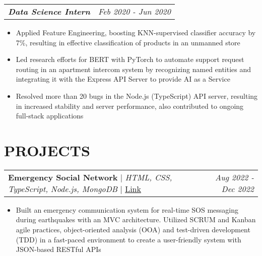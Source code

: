 \documentclass[letterpaper]{article}
\makeatletter
\newcommand{\resumeItemWithoutTitle}[1]{
  \item{
    {#1 \vspace{-4pt}}
  }
}
\newcommand{\resumeSubheadingWithoutTitle}[2]{
  \begin{tabular*}{\textwidth}{l@{\extracolsep{\fill}}r}
        \textbf{\textit{#1}} & \textit{ #2} \\
    \end{tabular*}\vspace{-15pt}
}
\newcommand{\shortSection}[1]{
    \vspace{-6pt}
    \section{#1}
}
\newcommand{\projectHeading}[4]{
  \begin{tabular*}{\textwidth}{l@{\extracolsep{\fill}}r}
        \textbf{#1} 
        \hspace{-2pt} $\vert$ \hspace{-2pt} {\textit{#2}} 
        \hspace{-2pt} $\vert$ \hspace{-2pt} \href{#3}{ \underline{Link}}
        &
        \textit{#4} \\
    \end{tabular*}\vspace{-2pt}
}
\newcommand{\resumeItemListStart}{\begin{itemize}}
\newcommand{\resumeItemListEnd}{\end{itemize}}
\makeatother
\begin{document}
\vspace{2pt}
\resumeSubheadingWithoutTitle
{Data Science Intern}{Feb 2020 - Jun 2020}
\vspace{0pt}
\resumeItemListStart
\resumeItemWithoutTitle{Applied Feature Engineering, boosting KNN-supervised classifier accuracy by 7\%, resulting in effective classification of products in an unmanned store}
\resumeItemWithoutTitle{Led research efforts for BERT with PyTorch to automate support request routing in an apartment intercom system by recognizing named entities and integrating it with the Express API Server to provide AI as a Service}
\resumeItemWithoutTitle{Resolved more than 20 bugs in the Node.js (TypeScript) API server, resulting in increased stability and server performance, also contributed to ongoing full-stack applications}
\resumeItemListEnd


\shortSection{PROJECTS}




\vspace{3pt}
\projectHeading {Emergency Social Network}{HTML, CSS, TypeScript, Node.js, MongoDB}{https://esn.onrender.com}{Aug 2022 - Dec 2022}
\resumeItemListStart
\resumeItemWithoutTitle{Built an emergency communication system for real-time SOS messaging during earthquakes with an MVC architecture. Utilized SCRUM and Kanban agile practices, object-oriented analysis (OOA) and test-driven development (TDD) in a fast-paced environment to create a user-friendly system with JSON-based RESTful APIs}
\resumeItemListEnd
\end{document}
